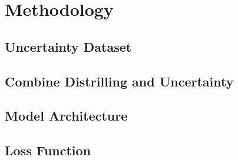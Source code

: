 \section{Methodology}

\subsection{Uncertainty Dataset}

\subsection{Combine Distrilling and Uncertainty}

\subsection{Model Architecture}

\subsection{Loss Function}